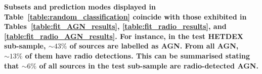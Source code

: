 \documentclass{aa}
\begin{document}
\begin{table}
  \setlength{\tabcolsep}{2pt}
  \caption{Results of no-skill selection of sources in different stages of pipeline to the labelled sources in the HETDEX test subset and \textbf{S82} fields.} %
  \label{table:random_classification}      %
  \centering                          %
\end{table}

\textbf{Subsets and prediction modes displayed in Table~\ref{table:random_classification} coincide with those exhibited in Tables~\ref{table:fit_AGN_results}, \ref{table:fit_radio_results}, and \ref{table:fit_radio_AGN_results}. For instance, in the test HETDEX sub-sample, ${\sim} 43 \%$ of sources are labelled as AGN. From all AGN, ${\sim} 13 \%$ of them have radio detections. This can be summarised stating that ${\sim} 6 \%$ of all sources in the test sub-sample are radio-detected AGN.}
\end{document}
